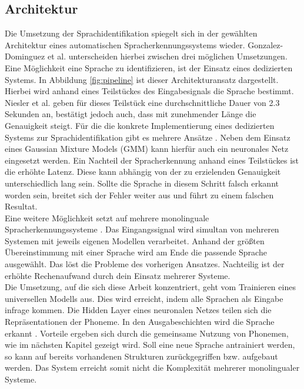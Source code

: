 \subsection{Architektur}
Die Umsetzung der Sprachidentifikation spiegelt sich in der gewählten Architektur eines automatischen Spracherkennungssystems wieder. Gonzalez-Dominguez et al. \cite{Gonzalez.2015} unterscheiden hierbei zwischen drei möglichen Umsetzungen.\\
Eine Möglichkeit eine Sprache zu identifizieren, ist der Einsatz eines dedizierten Systems. In Abbildung \ref{fig:pipeline} ist dieser Architekturansatz dargestellt. Hierbei wird anhand eines Teilstückes des Eingabesignals die Sprache bestimmt. Niesler et al. \cite{Niesler.2006} geben für dieses Teilstück eine durchschnittliche Dauer von 2.3 Sekunden an, bestätigt jedoch auch, dass mit zunehmender Länge die Genauigkeit steigt. Für die die konkrete Implementierung eines dedizierten Systems zur Sprachidentifikation gibt es mehrere Ansätze \cite{Niesler.2006}. Neben dem Einsatz eines Gaussian Mixture Models (GMM) kann hierfür auch ein neuronales Netz eingesetzt werden. Ein Nachteil der Spracherkennung anhand eines Teilstückes ist die erhöhte Latenz. Diese kann abhängig von der zu erzielenden Genauigkeit unterschiedlich lang sein. Sollte die Sprache in diesem Schritt falsch erkannt worden sein, breitet sich der Fehler weiter aus und führt zu einem falschen Resultat.\\
Eine weitere Möglichkeit setzt auf mehrere monolinguale Spracherkennungssysteme \cite{Gonzalez.2015}.
Das Eingangssignal wird simultan von mehreren Systemen mit jeweils eigenen Modellen verarbeitet.
Anhand der größten Übereinstimmung mit einer Sprache wird am Ende die passende Sprache ausgewählt.
Das löst die Probleme des vorherigen Ansatzes. Nachteilig ist der erhöhte Rechenaufwand durch dein Einsatz mehrerer Systeme. \\
Die Umsetzung, auf die sich diese Arbeit konzentriert, geht vom Trainieren eines universellen Modells aus. Dies wird erreicht, indem alle Sprachen als Eingabe infrage kommen. Die Hidden Layer eines neuronalen Netzes teilen sich die Repräsentationen der Phoneme. In den Ausgabeschichten wird die Sprache erkannt \cite{Yu.2014}. 
Vorteile ergeben sich durch die gemeinsame Nutzung von Phonemen, wie im nächsten Kapitel gezeigt wird. Soll eine neue Sprache antrainiert werden, so kann auf bereits vorhandenen Strukturen zurückgegriffen bzw. aufgebaut werden.
Das System erreicht somit nicht die Komplexität mehrerer monolingualer Systeme\cite{Bartz.2017}.





